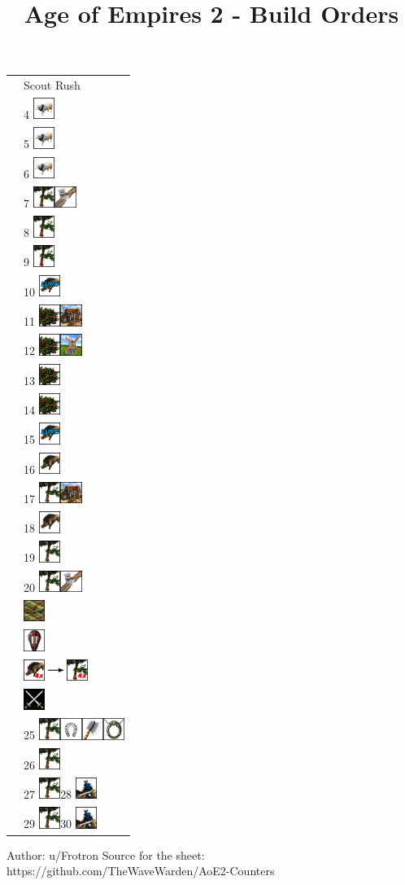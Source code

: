 \documentclass[11pt]{article}
\date{}
\title{Age of Empires 2 - Build Orders}
\newcommand{\imagew}{0.7cm}
\newcommand{\imagespace}{2mm}
\newcommand{\berries}{\includegraphics[width=\imagew]{icons/berries.png}\hspace{\imagespace}}
\newcommand{\boar}{\includegraphics[width=\imagew]{icons/boar.png}\hspace{\imagespace}}
\newcommand{\boarlure}{\includegraphics[width=\imagew]{icons/boarlure.png}\hspace{\imagespace}}
\newcommand{\boarfourx}{\includegraphics[width=\imagew]{icons/boar4x.png}\hspace{\imagespace}}
\newcommand{\scout}{\includegraphics[width=\imagew]{icons/scout.png}\hspace{\imagespace}}
\newcommand{\sheep}{\includegraphics[width=\imagew]{icons/sheep.png}\hspace{\imagespace}}
\newcommand{\tree}{\includegraphics[width=\imagew]{icons/tree.png}\hspace{\imagespace}}
\newcommand{\treefourx}{\includegraphics[width=\imagew]{icons/tree4x.png}\hspace{\imagespace}}
\newcommand{\house}{\includegraphics[width=\imagew]{icons/house.png}\hspace{\imagespace}}
\newcommand{\lumber}{\includegraphics[width=\imagew]{icons/lumber.png}\hspace{\imagespace}}
\newcommand{\mill}{\includegraphics[width=\imagew]{icons/mill.png}\hspace{\imagespace}}
\newcommand{\barracks}{\includegraphics[width=\imagew]{icons/barracks.png}\hspace{\imagespace}}
\newcommand{\feudal}{\includegraphics[width=\imagew]{icons/feudal.png}\hspace{\imagespace}}
\newcommand{\loom}{\includegraphics[width=\imagew]{icons/loom.png}\hspace{\imagespace}}
\newcommand{\stable}{\includegraphics[width=\imagew]{icons/stable.png}\hspace{\imagespace}}
\newcommand{\doublebitaxe}{\includegraphics[width=\imagew]{icons/doublebitaxe.png}\hspace{\imagespace}}
\newcommand{\horsecollar}{\includegraphics[width=\imagew]{icons/horsecollar.png}\hspace{\imagespace}}
\newcommand{\arrowright}{\includegraphics[width=\imagew]{icons/arrowright.png}\hspace{\imagespace}}
\begin{document}

\begin{center}
\begin{tabular}{ |m{}|m{}|}
 & Scout Rush \\ 
 & 4 \sheep \\ 
 & 5 \sheep \\ 
 & 6 \sheep \\ 
 & 7 \tree \lumber \\ 
 & 8 \tree \\ 
 & 9 \tree \\ 
 & 10 \boarlure \\ 
 & 11 \berries \house\\ 
 & 12 \berries  \mill \\
 & 13 \berries \\
 & 14 \berries \\
 & 15 \boarlure \\
 & 16 \boar \\
 & 17 \tree \house \\
 & 18 \boar \\
 & 19 \tree \\
 & 20 \tree \lumber \\
 & \loom \\
 & \feudal \\
 & \boarfourx \arrowright \treefourx \\
 & \barracks \\
 & 25 \tree \stable \doublebitaxe \horsecollar \\
 & 26 \tree \\
 & 27 \tree 28 \scout \\
 & 29 \tree 30 \scout \\
\end{tabular}

\vspace{2mm}
\tiny
Author: u/Frotron
Source for the sheet: https://github.com/TheWaveWarden/AoE2-Counters

\end{center}
\end{document}
